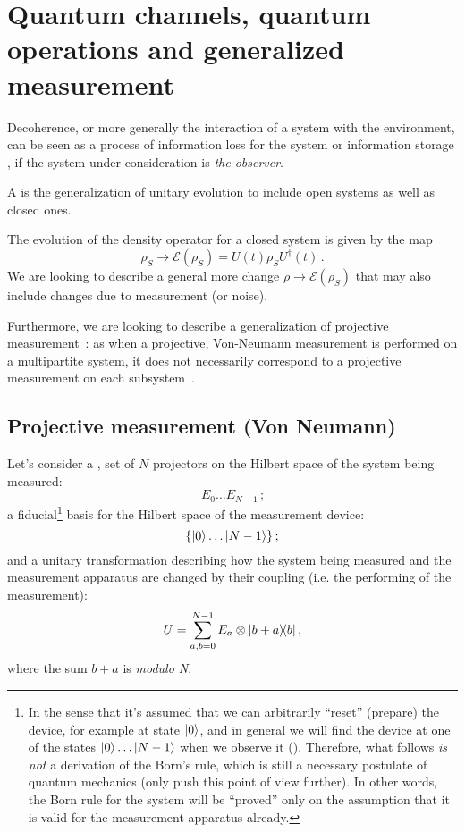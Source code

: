 \section[Channels, operations and generalized measurement]
  {Quantum channels, quantum operations and generalized measurement}

Decoherence,
or more generally the interaction of a system with the environment,
can be seen as a process of information loss for the system
\parencite[Ch. 9]{Nakahara} or information storage
\parencite{Zurek_Einselect}, if the system under consideration
is \emph{the observer}.

A  \parencite[Ch. 9]{Nakahara} is the generalization
of unitary evolution to include open systems as well as closed ones.

The evolution of the density operator for a closed system is given by the map
\[
    \rho_{S} \rightarrow \mathcal{E}(\rho_{S}) = U(t)\rho_{S}U^{\dagger}(t) \, \text{.}
\] 
We are looking to describe a general more change
$\rho \rightarrow \mathcal{E}(\rho_{S})$ that may also include
changes due to measurement (or noise).

Furthermore, we are looking to describe a generalization
of projective measurement~\parencite{VonNeumann}:
as when a projective, Von-Neumann
measurement is performed on a multipartite system,
it does not necessarily correspond to a projective measurement
on each subsystem~\parencite[Ch. 3]{PreskillNotes}.

\subsection{Projective measurement (Von Neumann)}

Let's consider a ,  set of $N$ projectors
on the Hilbert space
of the system being measured:
\[
  E_0 \dots E_{N-1} \,\text{;}
\]
a fiducial\footnote{
  In the sense that it's assumed
  that we can arbitrarily ``reset'' (prepare) the device,
  for example at state $\ket{0}$,
  and in general
  we will find the device at one of the states
  $\ket{0}\dots\ket{N-1}$
  when we observe it ().
  Therefore, what follows \emph{is not} a derivation of the Born's rule,
  which is still a necessary postulate of quantum mechanics
  (only \cite{Zurek_Decoherence, Zurek_Einselect, Zurek_Fundamentals} push
  this point of view further). In other words, the Born rule for the system
  will be ``proved''
  only on the assumption that it is valid for the measurement apparatus already.
}
basis for the Hilbert space of the measurement device:
\[
  \left\{\ket{0} \dots \ket{N-1}\right\} \text{;}
\]
and a unitary transformation describing how the
system being measured and the measurement apparatus
are changed by their coupling (i.e. the performing of the measurement):
\[
  U = \sum_{a, b = 0}^{N-1} E_a \otimes \ketbra{b+a}{b} \text{,}
\]
where the sum $b+a$ is \emph{modulo N}.


